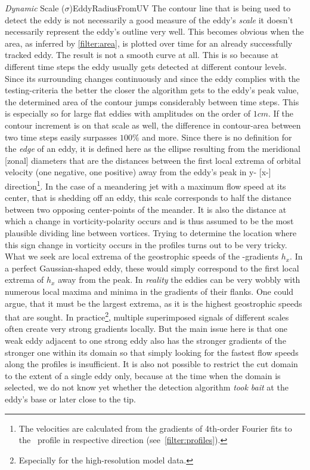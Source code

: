 \begin{filter}{\textit{Dynamic} Scale ($\sigma$)}{EddyRadiusFromUV}
 \label{filter:dynscale}
The contour line that is being used to detect the eddy is not
necessarily a good measure of the eddy's \textit{scale} \ie it doesn't
necessarily represent the eddy's outline very well. This becomes
obvious when the area, as inferred by \cref{filter:area}, is plotted over time
for an already successfully tracked eddy. The result is not a smooth curve at
all. This is so because at different time steps the eddy usually gets detected
at different contour levels. Since its surrounding changes continuously and
since the eddy complies with the testing-criteria the better the closer the
algorithm gets to the eddy's peak value, the determined area of the contour
jumps considerably between time steps. This is especially so for large flat
eddies with amplitudes on the order of $1cm$. If the contour increment is on
that scale as well, the difference in contour-area between two time steps
easily surpasses $100\%$ and more.
Since there is no definition for the \textit{edge} of an eddy, it is defined here as the ellipse resulting from the meridional [zonal] diameters that
are the distances between the first local extrema of orbital velocity (one negative, one positive) away from
the eddy's peak in y- [x-] direction\footnote{The velocities are calculated from the gradients of 4th-order Fourier fits to the \SSH~profile in respective direction (see~\cref{filter:profiles}).}.
In the case of a meandering jet with a maximum flow speed at its center, that
is shedding off an eddy, this scale corresponds to half the distance between
two opposing center-points of the meander. It is also the distance at which a
change in vorticity-polarity occurs and is thus assumed to be the most plausible
dividing line between vortices. 
Trying to determine the location where this sign change in vorticity occurs in the profiles turns out to be very tricky. What we seek are local extrema of the geostrophic speeds \ie of the \SSH-gradients $h_x$. In a perfect Gaussian-shaped eddy, these would simply correspond to the first local extrema of $h_x$ away from the peak. In \textit{reality} the eddies can be very wobbly with numerous local maxima and minima in the gradients of their flanks. One could argue, that it must be the largest extrema, as it is the highest geostrophic speeds that are sought. In practice\footnote{Especially for the high-resolution model data.}, multiple superimposed signals of different scales often create very strong gradients locally. But the main issue here is that one weak eddy adjacent to one strong eddy also has the stronger gradients of the stronger one within its domain so that simply looking for the fastest flow speeds along the profiles is insufficient. It is also not possible to restrict the cut domain to the extent of a single eddy only, because at the time when the domain is selected, we do not know yet whether the detection algorithm \textit{took bait} at the eddy's base or later close to the tip. \\

\end{filter}
